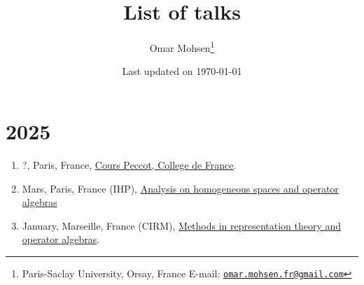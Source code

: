 \documentclass[a4paper, 13pt]{article}
\begin{document}
\title{List of talks}
\author{Omar Mohsen\thanks{
Paris-Saclay University, Orsay, France
\vskip-2pt E-mail: \href{mailto:omar.mohsen.fr@gmail.com}{\texttt{omar.mohsen.fr@gmail.com}}}}
\date{Last updated on \today}
\maketitle
\section*{2025}
  \begin{enumerate}
    \item ?, Paris, France, \href{}{Cours Peccot, College de France}.
    \item Mars, Paris, France (IHP), \href{https://indico.math.cnrs.fr/event/10858/}{ Analysis on homogeneous spaces and operator algebras}
    \item January,  Marseille, France (CIRM), \href{https://conferences.cirm-math.fr/3227.html}{Methods in representation theory and operator algebras}.
  \end{enumerate}
\end{document}
